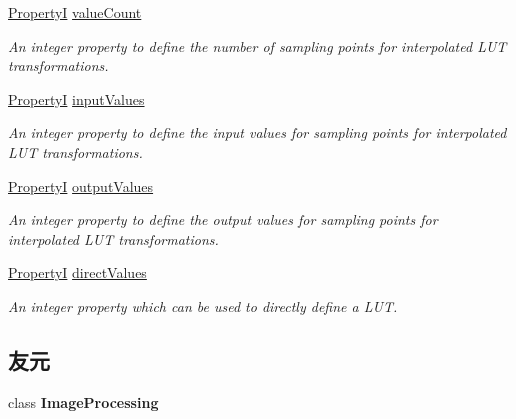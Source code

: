 \begin{DoxyCompactItemize}
\hyperlink{group___common_interface_ga12d5e434238ca242a1ba4c6c3ea45780}{Property\+I} \hyperlink{classmv_i_m_p_a_c_t_1_1acquire_1_1_l_u_t_parameters_a490895560ff62d99203f9b9cb008c26d}{value\+Count}
\begin{DoxyCompactList}\small\item\em An integer property to define the number of sampling points for interpolated L\+U\+T transformations. \end{DoxyCompactList}\item 
\hyperlink{group___common_interface_ga12d5e434238ca242a1ba4c6c3ea45780}{Property\+I} \hyperlink{classmv_i_m_p_a_c_t_1_1acquire_1_1_l_u_t_parameters_a819542e834bc096ca65bbcaa60084bb1}{input\+Values}
\begin{DoxyCompactList}\small\item\em An integer property to define the input values for sampling points for interpolated L\+U\+T transformations. \end{DoxyCompactList}\item 
\hyperlink{group___common_interface_ga12d5e434238ca242a1ba4c6c3ea45780}{Property\+I} \hyperlink{classmv_i_m_p_a_c_t_1_1acquire_1_1_l_u_t_parameters_aa95b0ab8ca26f36f4bd7f9aa20a5b808}{output\+Values}
\begin{DoxyCompactList}\small\item\em An integer property to define the output values for sampling points for interpolated L\+U\+T transformations. \end{DoxyCompactList}\item 
\hyperlink{group___common_interface_ga12d5e434238ca242a1ba4c6c3ea45780}{Property\+I} \hyperlink{classmv_i_m_p_a_c_t_1_1acquire_1_1_l_u_t_parameters_a7e9c15955ba076d23030f6954ca33da1}{direct\+Values}
\begin{DoxyCompactList}\small\item\em An integer property which can be used to directly define a L\+U\+T. \end{DoxyCompactList}\end{DoxyCompactItemize}
\subsection*{友元}
\begin{DoxyCompactItemize}
\item 
\hypertarget{classmv_i_m_p_a_c_t_1_1acquire_1_1_l_u_t_parameters_aed8a20fb12bb653b1bcd24b250b8e64f}{class {\bfseries Image\+Processing}}\label{classmv_i_m_p_a_c_t_1_1acquire_1_1_l_u_t_parameters_aed8a20fb12bb653b1bcd24b250b8e64f}

\end{DoxyCompactItemize}
